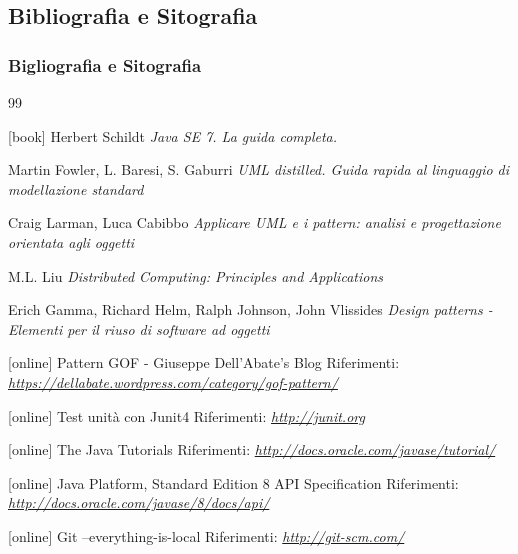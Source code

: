 \documentclass[t]{beamer} %
\begin{document}
\subsection {Bibliografia e Sitografia}
\begin {frame} [allowframebreaks] 
  \frametitle {Bigliografia e Sitografia}
  \begin {thebibliography}{99}
   {\tiny 
     [book]
      Herbert Schildt
     \newblock \emph{Java SE 7. La guida completa.} 

       Martin Fowler, L. Baresi, S. Gaburri 
     \newblock \emph{UML distilled. Guida rapida al linguaggio di modellazione standard} 

      Craig Larman, Luca Cabibbo
     \newblock \emph{Applicare UML e i pattern: analisi e progettazione orientata agli oggetti} 

      M.L. Liu
     \newblock \emph{Distributed Computing: Principles and Applications} 

      Erich Gamma, Richard Helm, Ralph Johnson, John Vlissides
     \newblock \emph{Design patterns - Elementi per il riuso di software ad oggetti} 
      
     [online]
      Pattern GOF - Giuseppe Dell'Abate's Blog
     \newblock Riferimenti: \emph{\url{https://dellabate.wordpress.com/category/gof-pattern/ }}

     [online]
      Test unità con Junit4
     \newblock Riferimenti: \emph{\url{http://junit.org }}

     [online]
      The Java Tutorials 
     \newblock Riferimenti: \emph{\url{http://docs.oracle.com/javase/tutorial/ }}

     [online]
      Java Platform, Standard Edition 8 API Specification 
     \newblock Riferimenti: \emph{\url{http://docs.oracle.com/javase/8/docs/api/ }}

     [online]
      Git --everything-is-local  
     \newblock Riferimenti: \emph{\url{http://git-scm.com/ }}

}
\end{thebibliography}
\end{frame}
\end{document}

